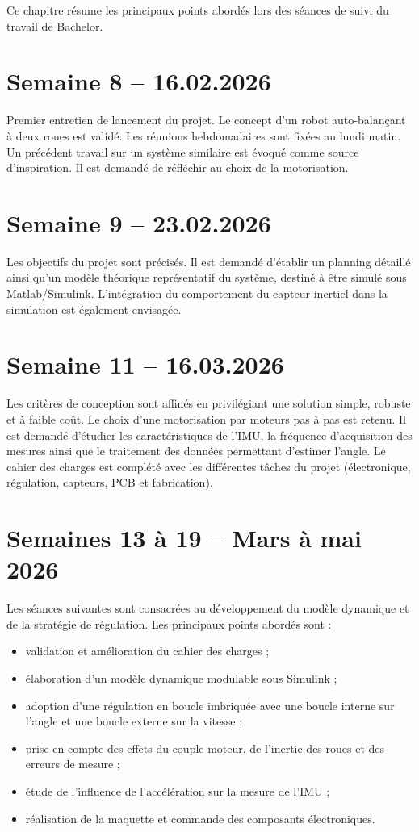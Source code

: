 
Ce chapitre résume les principaux points abordés lors des séances de suivi du travail de Bachelor.

\section*{Semaine 8 -- 16.02.2026}
Premier entretien de lancement du projet. Le concept d'un robot auto-balançant à deux roues est validé. Les réunions hebdomadaires sont fixées au lundi matin. Un précédent travail sur un système similaire est évoqué comme source d'inspiration. Il est demandé de réfléchir au choix de la motorisation.

\section*{Semaine 9 -- 23.02.2026}
Les objectifs du projet sont précisés. Il est demandé d'établir un planning détaillé ainsi qu'un modèle théorique représentatif du système, destiné à être simulé sous Matlab/Simulink. L'intégration du comportement du capteur inertiel dans la simulation est également envisagée.

\section*{Semaine 11 -- 16.03.2026}
Les critères de conception sont affinés en privilégiant une solution simple, robuste et à faible coût. Le choix d'une motorisation par moteurs pas à pas est retenu. Il est demandé d'étudier les caractéristiques de l'IMU, la fréquence d'acquisition des mesures ainsi que le traitement des données permettant d'estimer l'angle. Le cahier des charges est complété avec les différentes tâches du projet (électronique, régulation, capteurs, PCB et fabrication).

\section*{Semaines 13 à 19 -- Mars à mai 2026}
Les séances suivantes sont consacrées au développement du modèle dynamique et de la stratégie de régulation. Les principaux points abordés sont :
\begin{itemize}
    \item validation et amélioration du cahier des charges ;
    \item élaboration d'un modèle dynamique modulable sous Simulink ;
    \item adoption d'une régulation en boucle imbriquée avec une boucle interne sur l'angle et une boucle externe sur la vitesse ;
    \item prise en compte des effets du couple moteur, de l'inertie des roues et des erreurs de mesure ;
    \item étude de l'influence de l'accélération sur la mesure de l'IMU ;
    \item réalisation de la maquette et commande des composants électroniques.
\end{itemize}

